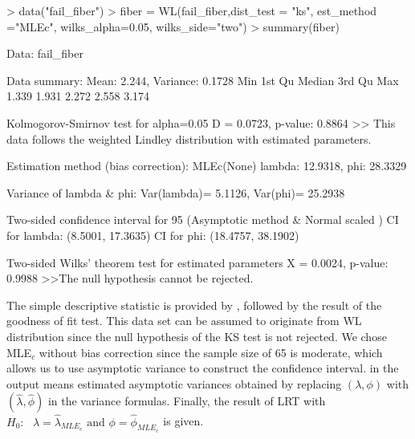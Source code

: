 \begin{example}
	> data("fail_fiber")
	> fiber = WL(fail_fiber,dist_test = "ks", est_method ="MLEc",
	             wilks_alpha=0.05, wilks_side="two")
	> summary(fiber)
	
	Data: fail_fiber 
	
	Data summary:
	Mean: 2.244, Variance: 0.1728 
	Min    1st Qu Median 3rd Qu Max
	1.339  1.931  2.272  2.558  3.174
	
	Kolmogorov-Smirnov test for alpha=0.05 
	D = 0.0723, p-value: 0.8864
	>> This data follows the weighted Lindley distribution with estimated parameters.
	
	Estimation method (bias correction): MLEc(None) 
	lambda: 12.9318, phi: 28.3329 
	
	Variance of lambda & phi:
	Var(lambda)= 5.1126, Var(phi)= 25.2938 
	
	Two-sided confidence interval for 95%
	(Asymptotic method & Normal scaled ) 
	CI for lambda: (8.5001, 17.3635) 
	CI for phi: (18.4757, 38.1902) 
	
	Two-sided Wilks' theorem test for estimated parameters 
	X = 0.0024, p-value: 0.9988
	>>The null hypothesis cannot be rejected.
\end{example}
 The simple descriptive statistic is provided by , followed by the result of the goodness of fit test. This data set can be assumed to originate from WL distribution since the null hypothesis of the KS test is not rejected. We chose MLE$_c$ without bias correction since the sample size of 65 is moderate, which allows us to use asymptotic variance to construct the confidence interval.  in the output means estimated asymptotic variances obtained by replacing $\left(\lambda,\phi\right)$ with $\left(\widehat{\lambda},\widehat{\phi}\right)$ in the variance formulas. Finally, the result of LRT with $H_{0}:\text{ }\lambda = \widehat{\lambda}_{MLE_{c}}\text{ and }\phi = \widehat{\phi}_{MLE_{c}}$ is given. 
